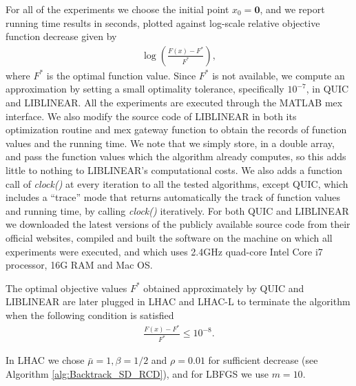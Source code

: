 \documentclass[11pt]{article}
\numberwithin{equation}{section}
\begin{document}
For all of the experiments we choose the initial point $x_0 = \mathbf{0}$, and we report running time results in seconds, plotted against log-scale relative objective function decrease given by
\begin{align}        
    \log(\frac{ F(x) - F^* }{ F^* }),
\end{align}
where $F^*$ is the optimal function value. Since $F^*$ is not available, we compute an approximation by setting a small optimality tolerance,  specifically $10^{-7}$, in QUIC and LIBLINEAR. All the experiments are executed through the MATLAB mex interface. 
We also modify the source code of LIBLINEAR in both its optimization routine and mex gateway function to obtain the records of function values and the running time. We note that we simply store, in a double array, and pass the function values which the algorithm already computes,  so this adds little to nothing to LIBLINEAR's computational costs. We also adds a function call of \emph{clock()} at every iteration to all the tested algorithms, except  QUIC, which includes  a ``trace'' mode that returns automatically the track of function values and running time,  by calling \emph{clock()} iteratively. For both QUIC and LIBLINEAR we downloaded the latest versions of the publicly available source code from their official websites, compiled and built the software on the  machine on which all experiments were executed, and which uses 2.4GHz quad-core Intel Core i7 processor, 16G RAM and Mac OS.  

The optimal objective values $F^*$ obtained approximately by QUIC and LIBLINEAR are later plugged in LHAC and LHAC-L to terminate the algorithm when the following condition is satisfied
\begin{align}
    \frac{ F(x) - F^* }{ F^* } \leq 10^{-8}.
\end{align}

In LHAC we chose $\bar \mu = 1, \beta = 1/2$ and $\rho = 0.01$ for sufficient decrease (see Algorithm \ref{alg:Backtrack_SD_RCD}), and for LBFGS we use $m = 10$. 
\end{document}
